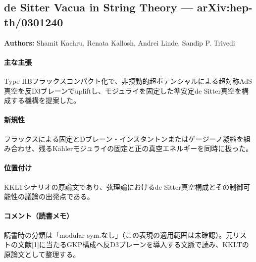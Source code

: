 \subsection{de Sitter Vacua in String Theory --- arXiv:hep-th/0301240}

\textbf{Authors:} Shamit Kachru, Renata Kallosh, Andrei Linde, Sandip P. Trivedi

\paragraph{主な主張}
Type IIBフラックスコンパクト化で、非摂動的超ポテンシャルによる超対称AdS真空を反D3ブレーンでupliftし、モジュライを固定した準安定de Sitter真空を構成する機構を提案した。 \cite{Kachru:2003aw}

\paragraph{新規性}
フラックスによる固定とDブレーン・インスタントンまたはゲージーノ凝縮を組み合わせ、残るK\"ahlerモジュライの固定と正の真空エネルギーを同時に扱った。

\paragraph{位置付け}
KKLTシナリオの原論文であり、弦理論におけるde Sitter真空構成とその制御可能性の議論の出発点である。

\paragraph{コメント（読書メモ）}
読書時の分類は「modular sym.なし」（この表現の適用範囲は未確認）。元リストの文献[1]に当たるGKP構成\cite{Giddings:2001yu}へ反D3ブレーンを導入する文脈で読み、KKLTの原論文として整理する。
